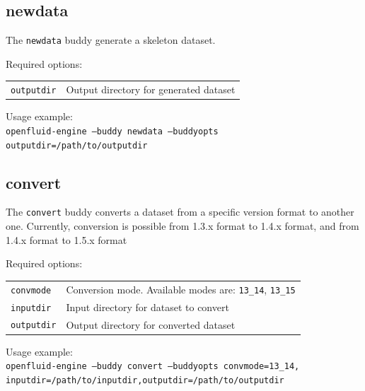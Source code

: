 \subsection{newdata}

The \texttt{newdata} buddy generate a skeleton dataset. 

\bigskip

\noindent Required options:
\begin{center}
\begin{tabularx}{\linewidth}{lX}
\texttt{outputdir}&Output directory for generated dataset\\
\end{tabularx}
\end{center}

\bigskip

\noindent Usage example:\\
\texttt{openfluid-engine --buddy newdata --buddyopts
outputdir=/path/to/outputdir}

\subsection{convert}

The \texttt{convert} buddy converts a dataset from a specific version format to another one.
Currently, conversion is possible from 1.3.x format to 1.4.x format, and from 1.4.x format to 1.5.x format 

\bigskip

\noindent Required options:
\begin{center}
\begin{tabularx}{\linewidth}{lX} 
\texttt{convmode}&Conversion mode. Available modes are: \texttt{13\_14}, \texttt{13\_15}\\
\texttt{inputdir}&Input directory for dataset to convert\\ 
\texttt{outputdir}&Output directory for converted dataset\\
\end{tabularx}
\end{center}

\bigskip

\noindent Usage example:\\
\texttt{openfluid-engine --buddy convert --buddyopts convmode=13\_14,
inputdir=/path/to/inputdir,outputdir=/path/to/outputdir}


